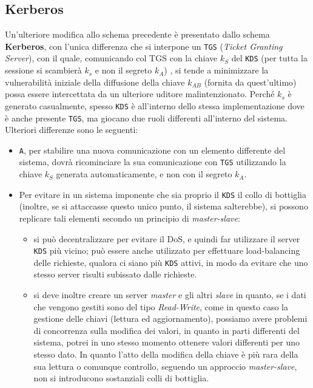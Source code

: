 \subsection{Kerberos}
Un'ulteriore modifica allo schema precedente è presentato dallo schema \textbf{Kerberos},
con l'unica differenza che si interpone un \texttt{TGS} (\textit{Ticket Granting Server}),
con il quale, comunicando col TGS con la chiave $k_S$ del \texttt{KDS} (per tutta la 
sessione si scambierà $k_s$ e non il segreto $k_A$) , si tende a minimizzare 
la vulnerabilità iniziale della diffusione della chiave $k_{AB}$ (fornita da 
quest'ultimo) possa essere intercettata da un ulteriore uditore  malintenzionato.
Perché $k_s$ è generato casualmente, spesso \texttt{KDS} è all'interno dello stessa implementazione dove è anche presente 
\texttt{TGS}, ma giocano due ruoli differenti all'interno del sistema. Ulteriori
differenze sono le seguenti:
\begin{itemize}
\item \texttt A, per stabilire una nuova comunicazione con un elemento differente del
	sistema, dovrà ricominciare la sua comunicazione con \texttt{TGS} utilizzando
	la chiave $k_S$ generata automaticamente, e non con il segreto $k_A$.
\item Per evitare in un sistema imponente che sia proprio il \texttt{KDS} il collo di
	bottiglia (inoltre, se si attaccasse questo unico punto, il sistema
	salterebbe), si possono replicare tali elementi secondo un principio di
	\textit{master-slave}:
	\begin{itemize}
	\item si può decentralizzare per evitare il DoS, e quindi far utilizzare
		il server \texttt{KDS} più vicino; può essere anche utilizzato per
		effettuare load-balancing delle richieste, qualora ci siano più
		\texttt{KDS} attivi, in modo da evitare che uno stesso server risulti
		subissato dalle richieste.
	\item si deve inoltre creare un server \textit{master} e gli altri \textit{slave} in
		quanto, se i dati che vengono gestiti sono del tipo \textit{Read-Write},
		come in questo caso la gestione delle chiavi (lettura ed aggiornamento),
		possiamo avere problemi di concorrenza sulla modifica dei valori,
		in quanto in parti differenti del sistema, potrei in uno stesso
		momento ottenere valori differenti per uno stesso dato. In quanto
		l'atto della modifica della chiave è più rara della sua lettura
		o comunque controllo, seguendo un approccio \textit{master-slave},
		non si introducono sostanziali colli di bottiglia.
	\end{itemize}
\end{itemize}

